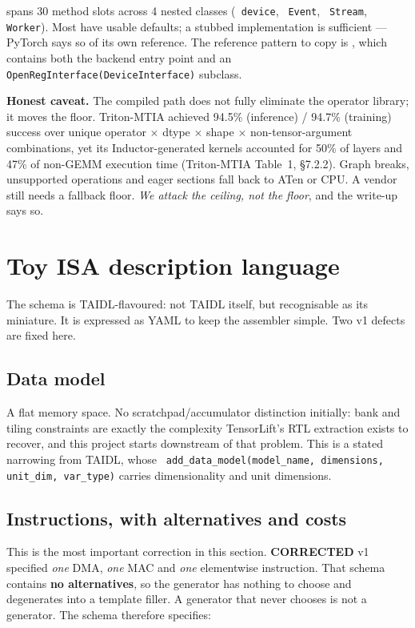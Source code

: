 \documentclass[11pt,a4paper]{article}
\newcommand{\code}[1]{\texttt{\small\hyphenchar\font=45 #1}}
\newcommand{\falsified}{\textbf{\textcolor{red!75!black}{CORRECTED}}}
\begin{document}
\noindent{} spans 30 method slots across 4 nested classes
(\code{device}, \code{Event}, \code{Stream}, \code{Worker}). Most have usable defaults; a stubbed
implementation is sufficient --- PyTorch says so of its own reference. The reference pattern to copy is
, which
contains both the backend entry point and an \code{OpenRegInterface(DeviceInterface)} subclass.

\noindent\textbf{Honest caveat.} The compiled path does not fully eliminate the operator library; it moves
the floor. Triton-MTIA achieved 94.5\% (inference) / 94.7\% (training) success over unique
operator $\times$ dtype $\times$ shape $\times$ non-tensor-argument combinations, yet its Inductor-generated
kernels accounted for 50\% of layers and 47\% of non-GEMM execution time (Triton-MTIA Table~1, \S7.2.2).
Graph breaks, unsupported operations and eager sections fall back to ATen or CPU. A vendor still needs a
fallback floor. \emph{We attack the ceiling, not the floor}, and the write-up says so.

\section{Toy ISA description language}\label{sec:isa}

The schema is TAIDL-flavoured: not TAIDL itself, but recognisable as its miniature. It is expressed as YAML
to keep the assembler simple. Two v1 defects are fixed here.

\subsection{Data model}

A flat memory space. No scratchpad/accumulator distinction initially: bank and tiling constraints are exactly
the complexity TensorLift's RTL extraction exists to recover, and this project starts downstream of that
problem. This is a stated narrowing from TAIDL, whose \code{add\_data\_model(model\_name, dimensions,
unit\_dim, var\_type)} carries dimensionality and unit dimensions.

\subsection{Instructions, with alternatives and costs}\label{sec:isa-variants}

\noindent This is the most important correction in this section. \falsified{} v1 specified \emph{one} DMA,
\emph{one} MAC and \emph{one} elementwise instruction. That schema contains \textbf{no alternatives}, so the
generator has nothing to choose and degenerates into a template filler. A generator that never chooses is
not a generator. The schema therefore specifies:
\end{document}
